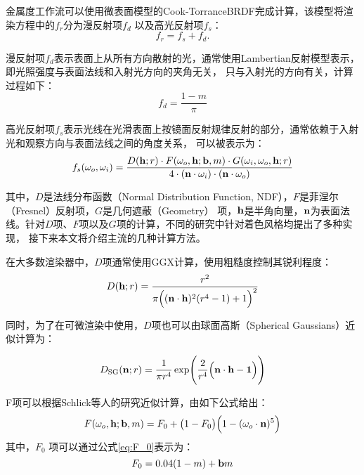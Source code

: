 金属度工作流可以使用微表面模型的Cook-TorranceBRDF完成计算，该模型将渲染方程中的$f_r$分为漫反射项$f_d$
以及高光反射项$f_s$：
\begin{equation}\label{eq:cook-torrance}
f_r=f_s+f_d.
\end{equation}

漫反射项$f_d$表示表面上从所有方向散射的光，通常使用Lambertian反射模型表示，即光照强度与表面法线和入射光方向的夹角无关，
只与入射光的方向有关，计算过程如下：
\begin{equation}\label{eq:lambertian}
f_d=\frac{1-m}{\pi}
\end{equation}

高光反射项$f_s$表示光线在光滑表面上按镜面反射规律反射的部分，通常依赖于入射光和观察方向与表面法线之间的角度关系，
可以被表示为：
\begin{equation}\label{eq:specular}
f_s(\omega_o,\omega_i)=\frac{D({\bf{h}};r)\cdot F(\omega_o,{\bf{h}};{\bf{b}},m)\cdot G(\omega_i,\omega_o,{\bf{h}};r)}
{4\cdot({\bf{n}}\cdot\omega_i)\cdot({\bf{n}}\cdot\omega_o)}
\end{equation}

其中，$D$是法线分布函数（Normal Distribution Function, NDF），$F$是菲涅尔（Fresnel）反射项，$G$是几何遮蔽（Geometry）
项，$\bf{h}$是半角向量，$\bf{n}$为表面法线。针对$D$项、$F$项以及$G$项的计算，不同的研究中针对着色风格均提出了多种实现，
接下来本文将介绍主流的几种计算方法。

在大多数渲染器中，$D$项通常使用GGX\cite{walter2007microfacet}计算，使用粗糙度控制其锐利程度：
\begin{equation}\label{eq:D_ggx}
D({\bf{h}};r)=\frac{r^2}{\pi\Bigl(({\bf{n}}\cdot{\bf{h}})^2(r^4-1)+1\Bigr)^2}
\end{equation}

同时，为了在可微渲染中使用，$D$项也可以由球面高斯（Spherical Gaussians）近似计算为：

\begin{equation}\label{eq:Dsg}
D_{\rm{SG}}({\bf{n}};r)=\frac{1}{\pi r^4}\exp\Biggl(\frac{2}{r^4}\Bigl({\bf{n}}\cdot{\bf{h}}-\mathbf{1}\Bigr)\Biggr)
\end{equation}

F项可以根据Schlick等人\cite{schlick1994inexpensive}的研究近似计算，由如下公式给出：
\begin{equation}
  \label{eq:F}
  F(\omega_o,{\bf{h}};{\bf{b}},m)=F_0+\bigl(1-F_0\bigr)\Bigl(1-(\omega_o\cdot{\bf{n}})^5\Bigr)
\end{equation}
其中，$F_0$ 项可以通过公式\eqref{eq:F_0}表示为：
\begin{equation}
  \label{eq:F_0}
  F_0=0.04(1-m)+{\bf{b}}m
\end{equation}

